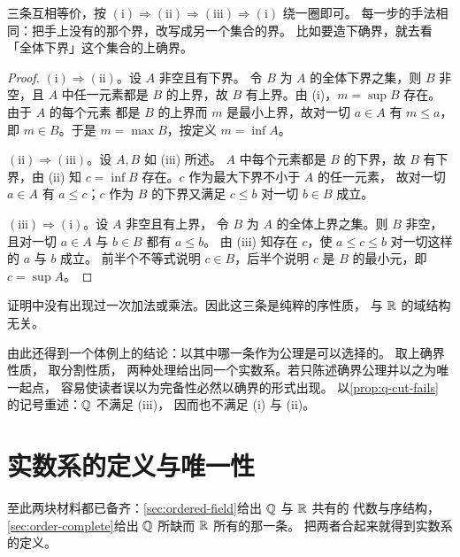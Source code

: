 \begin{strategy}
  三条互相等价，按 \((\mathrm{i}) \Rightarrow (\mathrm{ii}) \Rightarrow
  (\mathrm{iii}) \Rightarrow (\mathrm{i})\) 绕一圈即可。
  每一步的手法相同：把手上没有的那个界，改写成另一个集合的界。
  比如要造下确界，就去看「全体下界」这个集合的上确界。
\end{strategy}

\begin{proof}
  \((\mathrm{i}) \Rightarrow (\mathrm{ii})\)。设 \(A\) 非空且有下界。
  令 \(B\) 为 \(A\) 的全体下界之集，则 \(B\) 非空，且 \(A\) 中任一元素都是 \(B\)
  的上界，故 \(B\) 有上界。由 (i)，\(m = \sup B\) 存在。由于 \(A\) 的每个元素
  都是 \(B\) 的上界而 \(m\) 是最小上界，故对一切 \(a \in A\) 有 \(m \le a\)，
  即 \(m \in B\)。于是 \(m = \max B\)，按定义 \(m = \inf A\)。

  \((\mathrm{ii}) \Rightarrow (\mathrm{iii})\)。设 \(A, B\) 如 (iii) 所述。
  \(A\) 中每个元素都是 \(B\) 的下界，故 \(B\) 有下界，由 (ii) 知
  \(c = \inf B\) 存在。\(c\) 作为最大下界不小于 \(A\) 的任一元素，
  故对一切 \(a \in A\) 有 \(a \le c\)；\(c\) 作为 \(B\) 的下界又满足
  \(c \le b\) 对一切 \(b \in B\) 成立。

  \((\mathrm{iii}) \Rightarrow (\mathrm{i})\)。设 \(A\) 非空且有上界，
  令 \(B\) 为 \(A\) 的全体上界之集。则 \(B\) 非空，
  且对一切 \(a \in A\) 与 \(b \in B\) 都有 \(a \le b\)。
  由 (iii) 知存在 \(c\)，使 \(a \le c \le b\) 对一切这样的 \(a\) 与 \(b\) 成立。
  前半个不等式说明 \(c \in B\)，后半个说明 \(c\) 是 \(B\) 的最小元，即 \(c = \sup A\)。
\end{proof}

\begin{remark}
  证明中没有出现过一次加法或乘法。因此这三条是纯粹的序性质，
  与 \(\mathbb{R}\) 的域结构无关。

  由此还得到一个体例上的结论：以其中哪一条作为公理是可以选择的。
  \textcite{garling2013} 取上确界性质，\textcite{zorich2015} 取分割性质，
  两种处理给出同一个实数系。若只陈述确界公理并以之为唯一起点，
  容易使读者误以为完备性必然以确界的形式出现。
  以\cref{prop:q-cut-fails} 的记号重述：\(\mathbb{Q}\) 不满足 (iii)，
  因而也不满足 (i) 与 (ii)。
\end{remark}

\section{实数系的定义与唯一性}
\label{sec:def-reals}

至此两块材料都已备齐：\cref{sec:ordered-field}给出 \(\mathbb{Q}\) 与 \(\mathbb{R}\) 共有的
代数与序结构，\cref{sec:order-complete}给出 \(\mathbb{Q}\) 所缺而 \(\mathbb{R}\) 所有的那一条。
把两者合起来就得到实数系的定义。


